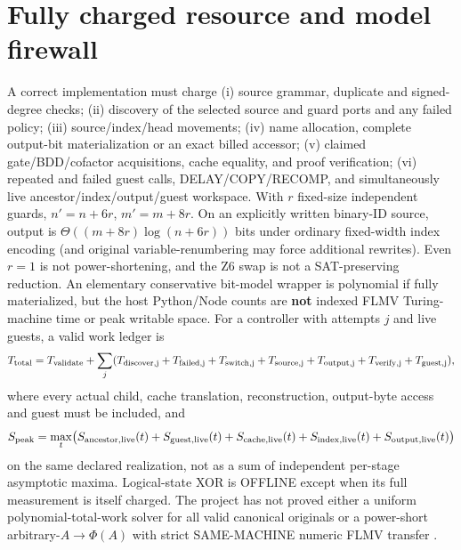 \documentclass[11pt]{article}
\begin{document}
\section{Fully charged resource and model firewall}
A correct implementation must charge (i) source grammar, duplicate and signed-degree checks; (ii) discovery of the selected source and guard ports and any failed policy; (iii) source/index/head movements; (iv) name allocation, complete output-bit materialization or an exact billed accessor; (v) claimed gate/BDD/cofactor acquisitions, cache equality, and proof verification; (vi) repeated and failed guest calls, DELAY/COPY/RECOMP, and simultaneously live ancestor/index/output/guest workspace. With $r$ fixed-size independent guards, $n'=n+6r$, $m'=m+8r$. On an explicitly written binary-ID source, output is $\Theta((m+8r)\log(n+6r))$ bits under ordinary fixed-width index encoding (and original variable-renumbering may force additional rewrites). Even $r=1$ is not power-shortening, and the Z6 swap is not a SAT-preserving reduction. An elementary conservative bit-model wrapper is polynomial if fully materialized, but the host Python/Node counts are \textbf{not} indexed FLMV Turing-machine time or peak writable space. For a controller with attempts $j$ and live guests, a valid work ledger is
\[
T_{\rm total}=T_{\rm validate}+\sum_j(T_{\rm discover,j}+T_{\rm failed,j}+T_{\rm switch,j}+T_{\rm source,j}+T_{\rm output,j}+T_{\rm verify,j}+T_{\rm guest,j}),
\]
where every actual child, cache translation, reconstruction, output-byte access and guest must be included, and
\[
S_{\rm peak}=\max_t\bigl(S_{\rm ancestor,live}(t)+S_{\rm guest,live}(t)+S_{\rm cache,live}(t)+S_{\rm index,live}(t)+S_{\rm output,live}(t)\bigr)
\]
on the same declared realization, not as a sum of independent per-stage asymptotic maxima. Logical-state XOR is OFFLINE except when its full measurement is itself charged. The project has not proved either a uniform polynomial-total-work solver for all valid canonical originals or a power-short arbitrary-$A\to\Phi(A)$ with strict SAME-MACHINE numeric FLMV transfer \cite{flmv2005}.
\end{document}
